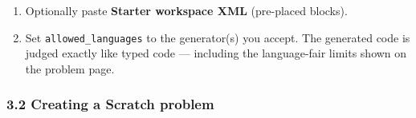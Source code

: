 \documentclass[
]{article}
\begin{document}
\begin{enumerate}
  Site blocks: \texttt{wc\_input\_number} (read an integer) and
  \texttt{wc\_input\_line} (read a text line) --- generated Python
  \texttt{int(input())} / \texttt{input()}; JS \texttt{wcReadNumber()} /
  \texttt{wcReadLine()} with a one-shot stdin-reader preamble the editor
  prepends automatically.
\item
  Optionally paste \textbf{Starter workspace XML} (pre-placed blocks).
\item
  Set \texttt{allowed\_languages} to the generator(s) you accept. The
  generated code is judged exactly like typed code --- including the
  language-fair limits shown on the problem page.
\end{enumerate}

\subsubsection{3.2 Creating a Scratch
problem}\label{32-creating-a-scratch-problem}
\end{document}
